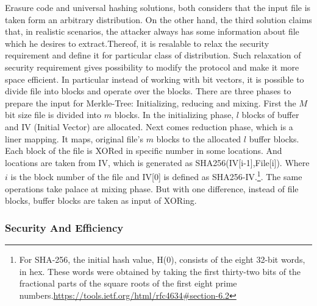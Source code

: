 \documentclass[12pt]{article}
\begin{document}
Erasure code and universal hashing solutions, both considers that the input file is taken form an arbitrary distribution. On the other hand, the third solution claims that, in realistic scenarios, the attacker always has some information about file which he desires to extract.Thereof, it is resalable to relax the security requirement and define  it for particular class of distribution. Such relaxation of security requirement gives possibility to modify the protocol and make it more space efficient.  In particular instead of working with bit vectors, it is possible to divide file into blocks and operate over the blocks. There are three phases to prepare the input for Merkle-Tree: Initializing, reducing and mixing. First the $M$ bit size file is divided into $m$ blocks. In the initializing phase, $l$ blocks of buffer and IV (Initial Vector) are allocated. Next comes reduction phase, which is a liner mapping. It maps, original file's $m$ blocks to the allocated $l$ buffer blocks. Each block of the file is XORed in specific number in some locations. And locations are taken from IV, which is generated as SHA256(IV[i-1],File[i]). Where $i$ is the block number of the file and IV[0] is defined as SHA256-IV.\footnote{For SHA-256, the initial hash value, H(0), consists of the eight 32-bit words, in hex. These words were obtained by taking the first thirty-two bits of the fractional parts of the square roots of the first eight prime numbers.\url{https://tools.ietf.org/html/rfc4634\#section-6.2}}. The same operations take palace at mixing phase. But with one difference, instead of file blocks, buffer blocks are taken as input of XORing. 
\subsubsection{Security And Efficiency}
\label{subsub:secAndeff1}
\end{document}
